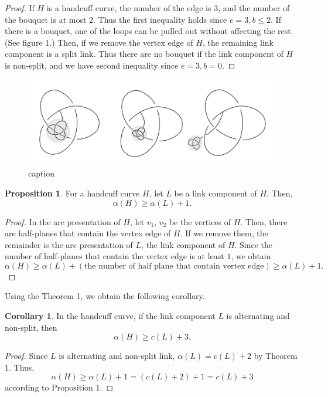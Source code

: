 \documentclass{article}
\theoremstyle{definition}
\theoremstyle{theorem}
\theoremstyle{proposition}
\newtheorem{prop}{Proposition}
\theoremstyle{corollary}
\newtheorem{corol}[thm]{Corollary}
\begin{document}
\begin{proof}
    If $H$ is a handcuff curve, the number of the edge is $3$, and the number of the bouquet is at most $2$. Thus the first inequality holds since $e=3, b \leq 2$. If there is a bouquet, one of the loops can be pulled out without affecting the rest. (See figure 1.) Then, if we remove the vertex edge of $H$, the remaining link component is a split link. Thus there are no bouquet if the link component of $H$ is non-split, and we have second inequality since $e=3, b=0$.
\end{proof}

\begin{figure}
    \centerline{\includegraphics[width=\textwidth]{image.png}}
    \caption{caption}
    \label{figure_4} 
\end{figure}

\begin{prop}
    For a handcuff curve $H$, let $L$ be a link component of $H$. Then,
    \[ \alpha(H) \geq \alpha(L)+1. \]
\end{prop}
\begin{proof}
    In the arc presentation of $H$, let $v_1$, $v_2$ be the vertices of $H$. Then, there are half-planes that contain the vertex edge of $H$. If we remove them, the remainder is the arc presentation of $L$, the link component of $H$. Since the number of half-planes that contain the vertex edge is at least $1$, we obtain
    \[ \alpha(H) \geq \alpha(L) + (\text{the number of half plane that contain vertex edge}) \geq \alpha(L)+1. \]
\end{proof}

Using the Theorem 1, we obtain the following corollary.

\begin{corol}
    In the handcuff curve, if the link component $L$ is alternating and non-split, then
    \[ \alpha(H) \geq c(L)+3. \]
\end{corol}

\begin{proof}
    Since $L$ is alternating and non-split link, $\alpha(L)=c(L)+2$ by Theorem 1. Thus, \[\alpha(H) \geq \alpha(L)+1 = \left( c(L)+2 \right)+1 = c(L)+3\] according to Proposition 1.
\end{proof}
\end{document}
